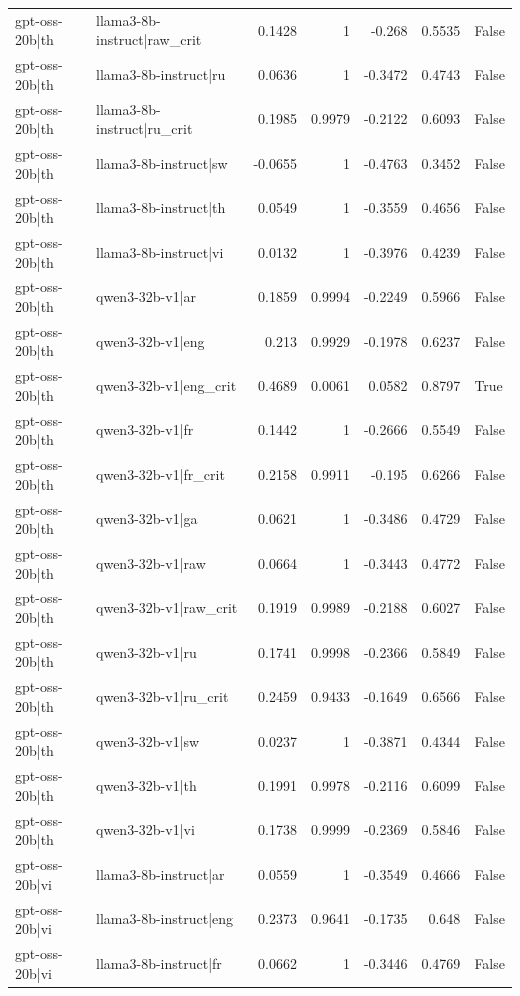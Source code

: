 \begin{table}
\begin{tabular}{l l r r r r l}
gpt-oss-20b|th & llama3-8b-instruct|raw_crit & 0.1428 & 1 & -0.268 & 0.5535 & False \\
gpt-oss-20b|th & llama3-8b-instruct|ru & 0.0636 & 1 & -0.3472 & 0.4743 & False \\
gpt-oss-20b|th & llama3-8b-instruct|ru_crit & 0.1985 & 0.9979 & -0.2122 & 0.6093 & False \\
gpt-oss-20b|th & llama3-8b-instruct|sw & -0.0655 & 1 & -0.4763 & 0.3452 & False \\
gpt-oss-20b|th & llama3-8b-instruct|th & 0.0549 & 1 & -0.3559 & 0.4656 & False \\
gpt-oss-20b|th & llama3-8b-instruct|vi & 0.0132 & 1 & -0.3976 & 0.4239 & False \\
gpt-oss-20b|th & qwen3-32b-v1|ar & 0.1859 & 0.9994 & -0.2249 & 0.5966 & False \\
gpt-oss-20b|th & qwen3-32b-v1|eng & 0.213 & 0.9929 & -0.1978 & 0.6237 & False \\
gpt-oss-20b|th & qwen3-32b-v1|eng_crit & 0.4689 & 0.0061 & 0.0582 & 0.8797 & True \\
gpt-oss-20b|th & qwen3-32b-v1|fr & 0.1442 & 1 & -0.2666 & 0.5549 & False \\
gpt-oss-20b|th & qwen3-32b-v1|fr_crit & 0.2158 & 0.9911 & -0.195 & 0.6266 & False \\
gpt-oss-20b|th & qwen3-32b-v1|ga & 0.0621 & 1 & -0.3486 & 0.4729 & False \\
gpt-oss-20b|th & qwen3-32b-v1|raw & 0.0664 & 1 & -0.3443 & 0.4772 & False \\
gpt-oss-20b|th & qwen3-32b-v1|raw_crit & 0.1919 & 0.9989 & -0.2188 & 0.6027 & False \\
gpt-oss-20b|th & qwen3-32b-v1|ru & 0.1741 & 0.9998 & -0.2366 & 0.5849 & False \\
gpt-oss-20b|th & qwen3-32b-v1|ru_crit & 0.2459 & 0.9433 & -0.1649 & 0.6566 & False \\
gpt-oss-20b|th & qwen3-32b-v1|sw & 0.0237 & 1 & -0.3871 & 0.4344 & False \\
gpt-oss-20b|th & qwen3-32b-v1|th & 0.1991 & 0.9978 & -0.2116 & 0.6099 & False \\
gpt-oss-20b|th & qwen3-32b-v1|vi & 0.1738 & 0.9999 & -0.2369 & 0.5846 & False \\
gpt-oss-20b|vi & llama3-8b-instruct|ar & 0.0559 & 1 & -0.3549 & 0.4666 & False \\
gpt-oss-20b|vi & llama3-8b-instruct|eng & 0.2373 & 0.9641 & -0.1735 & 0.648 & False \\
gpt-oss-20b|vi & llama3-8b-instruct|fr & 0.0662 & 1 & -0.3446 & 0.4769 & False \\

\end{tabular}
\end{table}
